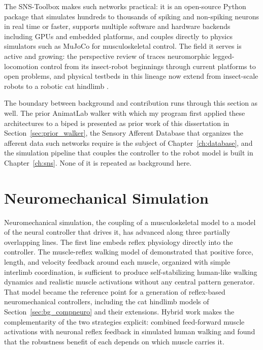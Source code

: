The SNS-Toolbox \citep{nourse_sns_2023} makes such networks practical: it is an open-source Python package that simulates hundreds to thousands of spiking and non-spiking neurons in real time or faster, supports multiple software and hardware backends including GPUs and embedded platforms, and couples directly to physics simulators such as MuJoCo for musculoskeletal control. The field it serves is active and growing: the perspective review of \citet{szczecinski_perspective_2023} traces neuromorphic legged-locomotion control from its insect-robot beginnings through current platforms to open problems, and physical testbeds in this lineage now extend from insect-scale robots to a robotic cat hindlimb \citep{armstead_design_2025}.

The boundary between background and contribution runs through this section as well. The prior AnimatLab walker with which my program first applied these architectures to a biped \citep{bolen_design_2020} is presented as prior work of this dissertation in Section~\ref{sec:prior_walker}, the Sensory Afferent Database that organizes the afferent data such networks require \citep{bolen_sensory_2023} is the subject of Chapter~\ref{ch:database}, and the simulation pipeline that couples the controller to the robot model is built in Chapter~\ref{ch:sns}. None of it is repeated as background here.

\section{Neuromechanical Simulation}\label{sec:bg_neuromech}

Neuromechanical simulation, the coupling of a musculoskeletal model to a model of the neural controller that drives it, has advanced along three partially overlapping lines. The first line embeds reflex physiology directly into the controller. The muscle-reflex walking model of \citet{geyer_musclereflex_2010} demonstrated that positive force, length, and velocity feedback around each muscle, organized with simple interlimb coordination, is sufficient to produce self-stabilizing human-like walking dynamics and realistic muscle activations without any central pattern generator. That model became the reference point for a generation of reflex-based neuromechanical controllers, including the cat hindlimb models of Section~\ref{sec:bg_compneuro} \citep{markin_afferent_2010, shevtsova_modeling_2016} and their extensions. Hybrid work makes the complementarity of the two strategies explicit: \citet{haeufle_benefit_2018} combined feed-forward muscle activations with neuronal reflex feedback in simulated human walking and found that the robustness benefit of each depends on which muscle carries it.

